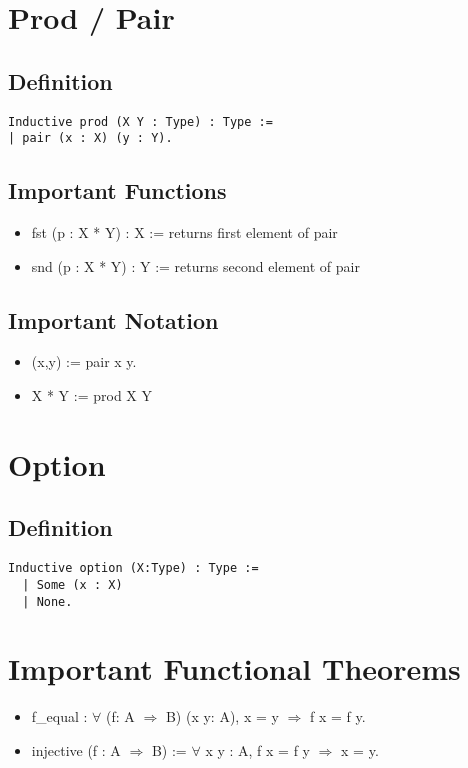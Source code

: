 \documentclass[12pt,a4paper]{article}
\theoremstyle{case}
\begin{document}
\section{Prod / Pair}
\subsection{Definition}
\begin{verbatim}
Inductive prod (X Y : Type) : Type :=
| pair (x : X) (y : Y).
\end{verbatim}
\subsection{Important Functions}
\begin{itemize}
    \item fst (p : X * Y) : X := returns first element of pair
    \item snd (p : X * Y) : Y := returns second element of pair
\end{itemize}
\subsection{Important Notation}
\begin{itemize}
    \item (x,y) := pair x y.
    \item X * Y := prod X Y  
\end{itemize}


\section{Option}
\subsection{Definition}
\begin{verbatim}
Inductive option (X:Type) : Type :=
  | Some (x : X)
  | None.
\end{verbatim}






\section{Important Functional Theorems}
\begin{itemize}
    \item f\_equal : $\forall$ (f: A $\Rightarrow$ B) (x y: A), x = y $\Rightarrow$ f x = f y.
    \item injective (f : A $\Rightarrow$ B) := $\forall$ x y : A, f x = f y $\Rightarrow$ x = y.
\end{itemize}
\end{document}

